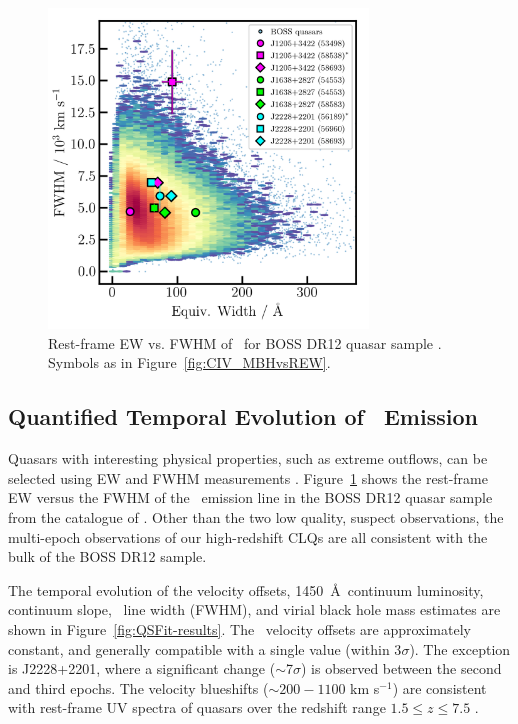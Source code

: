 \documentclass[fleqn,usenatbib]{mnras}
\begin{document}
\begin{figure}
  \centering
  \includegraphics[width=8.5cm, trim=0.2cm 0.2cm 0.0cm 0.2cm, clip]
  {figures/CIV_CLQs_REWvsFWHM_20200519.png}
  \vspace{-12pt}
  \caption[]{Rest-frame EW vs. FWHM of \civ\
    for BOSS DR12 quasar sample \citep{Hamann2017}.
   Symbols as in Figure~\ref{fig:CIV_MBHvsREW}.}
  \label{fig:REWvsFWHM}
\end{figure}

\subsection{Quantified Temporal Evolution of \civ\ Emission}
Quasars with interesting physical properties, such as extreme
outflows, can be selected using EW and FWHM measurements \citep[e.g.,
``Extremely Red Quasars'' ---][]{Ross2015, Zakamska2016, Zakamska2019,
Hamann2017}. Figure~\ref{fig:REWvsFWHM} shows the rest-frame EW versus
the FWHM of the \civ\ emission line in the BOSS DR12 quasar sample
from the catalogue of \citet{Hamann2017}.  Other than the two low
quality, suspect observations, the multi-epoch observations of our
high-redshift CLQs are all consistent with the bulk of the BOSS DR12
sample.

The temporal evolution of the velocity offsets, 1450~\AA\ continuum
luminosity, continuum slope, \civ\ line width (FWHM), and virial black
hole mass estimates are shown in Figure~\ref{fig:QSFit-results}.  The
\civ\ velocity offsets are approximately constant, and generally
compatible with a single value (within 3$\sigma$).  The exception is
J2228+2201, where a significant change ($\sim$7$\sigma$) is observed
between the second and third epochs. The velocity blueshifts ($\sim
200-1100$ km s$^{-1}$) are consistent with rest-frame UV spectra of
quasars over the redshift range $1.5 \leq z \leq 7.5$
\citep[e.g.,][]{Meyer2019}.
\end{document}
